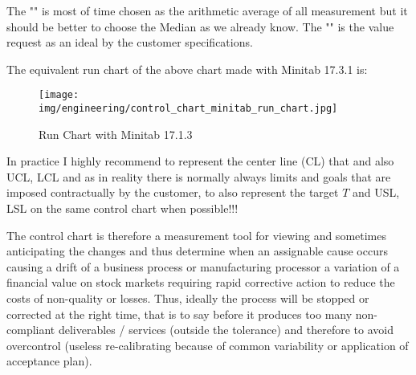 	The "" is most of time chosen as the arithmetic average of all measurement but it should be better to choose the Median as we already know. The "" is the value request as an ideal by the customer specifications.
	
	The equivalent run chart of the above chart made with Minitab 17.3.1 is:
	\begin{figure}[H]
		\centering
		\texttt{[image: img/engineering/control\_chart\_minitab\_run\_chart.jpg]}
		\caption{Run Chart with Minitab 17.1.3}
	\end{figure}
	
	In practice I highly recommend to represent  the center line (CL) that  and also UCL, LCL and as in reality there is normally always limits and goals that are imposed contractually by the customer, to also represent the target $T$ and  USL, LSL on the same control chart when possible!!!
	
	The control chart is therefore a measurement tool for viewing and sometimes anticipating the changes and thus determine when an assignable cause occurs causing a drift of a business process or manufacturing processor a variation of a financial value on stock markets requiring rapid corrective action to reduce the costs of non-quality or losses. Thus, ideally the process will be stopped or corrected at the right time, that is to say before it produces too many non-compliant deliverables / services (outside the tolerance) and therefore to avoid overcontrol (useless re-calibrating because of common variability or application of acceptance plan).

